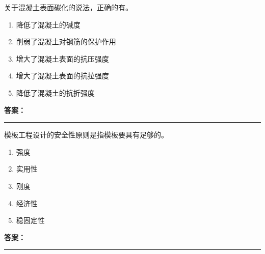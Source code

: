 \documentclass[UTF8,fontset=fandol,11pt]{ctexart}
\newcommand{\answerline}{\textcolor{answerred}{\rule{2.4cm}{0.7pt}}}
\begin{document}
\begin{quizbox}[title={乱序第 42 题｜第四章混凝土结构工程}]

关于混凝土表面碳化的说法，正确的有。\\

\begin{enumerate}[label=\Alph*.]

\item 降低了混凝土的碱度

\item 削弱了混凝土对钢筋的保护作用

\item 增大了混凝土表面的抗压强度

\item 增大了混凝土表面的抗拉强度

\item 降低了混凝土的抗折强度

\end{enumerate}

\textbf{\textcolor{answerred}{答案：}} \answerline

\end{quizbox}

\vspace{0.2em}

\begin{quizbox}[title={乱序第 43 题｜第四章混凝土结构工程}]

模板工程设计的安全性原则是指模板要具有足够的。\\

\begin{enumerate}[label=\Alph*.]

\item 强度

\item 实用性

\item 刚度

\item 经济性

\item 稳固定性

\end{enumerate}

\textbf{\textcolor{answerred}{答案：}} \answerline

\end{quizbox}

\vspace{0.2em}
\end{document}
